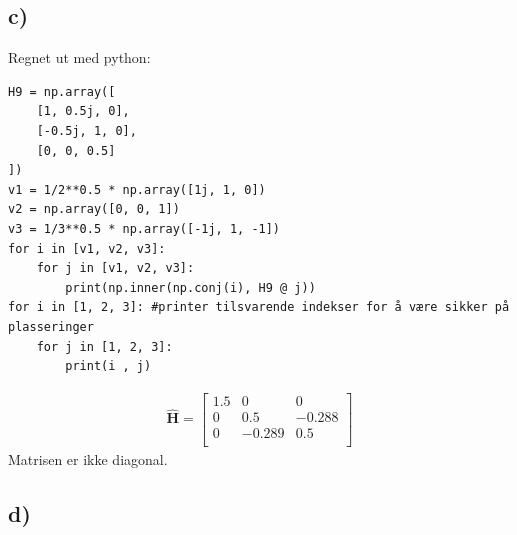 \documentclass[norsk,a4paper,12pt]{article}
\begin{document}
	\subsection*{c)}
	Regnet ut med python:
	\begin{verbatim}
H9 = np.array([
    [1, 0.5j, 0],
    [-0.5j, 1, 0],
    [0, 0, 0.5]
])
v1 = 1/2**0.5 * np.array([1j, 1, 0])
v2 = np.array([0, 0, 1])
v3 = 1/3**0.5 * np.array([-1j, 1, -1])
for i in [v1, v2, v3]:
    for j in [v1, v2, v3]:
        print(np.inner(np.conj(i), H9 @ j))
for i in [1, 2, 3]: #printer tilsvarende indekser for å være sikker på plasseringer
    for j in [1, 2, 3]:
        print(i , j)
	\end{verbatim}
	
	\begin{equation*}
	\begin{aligned}
	\mathbf{\hat{H}} = \begin{bmatrix}
	1.5 & 0 & 0 \\
	0 & 0.5 & -0.288 \\
	0 & -0.289 & 0.5 \\
	\end{bmatrix}
	\end{aligned}
	\end{equation*}
	Matrisen er ikke diagonal.
	
	\subsection*{d)}
	
\end{document}
